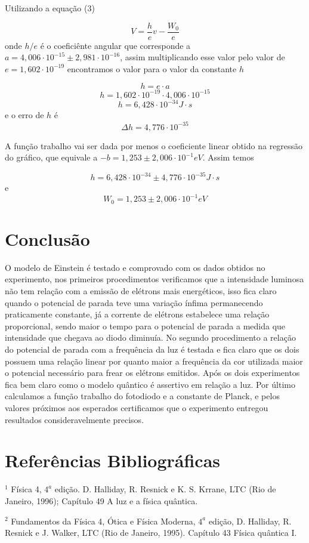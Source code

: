 \documentclass[12pt, a4paper]{article}
\begin{document}
\quad Utilizando a equação (3)

\[V=\frac{h}{e}v-\frac{W_{0}}{e}\]
onde $h/e$ é o coeficiênte angular que corresponde a $a=4,006\cdot 10^{-15} \pm 2,981\cdot 10^{-16}$, assim multiplicando esse valor pelo valor de $e=1,602\cdot 10^{-19}$ encontramos o valor para o valor da constante $h$

\[h=e\cdot a \]
\[h=1,602\cdot 10^{-19} \cdot 4,006\cdot 10^{-15}\]
\[h=6,428\cdot 10^{-34} J\cdot s\]
e o erro de $h$ é
\[\Delta h= 4,776 \cdot 10^{-35}\]

\quad A função trabalho vai ser dada por menos o coeficiente linear obtido na regressão do gráfico, que equivale a $-b=1,253\pm 2,006\cdot 10^{-1}eV$. Assim temos 

\[h=6,428\cdot 10^{-34}\pm  4,776 \cdot 10^{-35} J\cdot s\]
e
\[W_{0}=1,253\pm 2,006\cdot 10^{-1} eV\]

\section{Conclusão}
\quad O modelo de Einstein é testado e comprovado com os dados obtidos no experimento, nos primeiros procedimentos verificamos que a intensidade luminosa não tem relação com a emissão de elétrons mais energéticos, isso fica claro quando o potencial de parada teve uma variação ínfima permanecendo praticamente constante, já a corrente de elétrons estabelece uma relação proporcional, sendo maior o tempo para o potencial de parada a medida que intensidade que chegava ao diodo diminuía. No segundo procedimento a relação do potencial de parada com a frequência da luz é testada e fica claro que os dois possuem uma relação linear por quanto maior a frequência da cor utilizada maior o potencial necessário para frear os elétrons emitidos.
Após os dois experimentos fica bem claro como o modelo quântico é assertivo em relação a luz. Por último calculamos a função trabalho do fotodiodo e a constante de Planck, e pelos valores próximos aos esperados certificamos que o experimento entregou resultados consideravelmente precisos. 
\\

\section{Referências Bibliográficas}

$^{1}$ Física 4, $4^{a}$ edição. D. Halliday, R. Resnick e K. S. Krrane, LTC (Rio de Janeiro, 1996); Capítulo 49 A luz e a física quântica.

$^{2}$ Fundamentos da Física 4, Ótica e Física Moderna, $4^{a}$ edição, D. Halliday, R. Resnick e J. Walker, LTC (Rio de Janeiro, 1995). Capítulo 43 Física quântica I.
\end{document}
